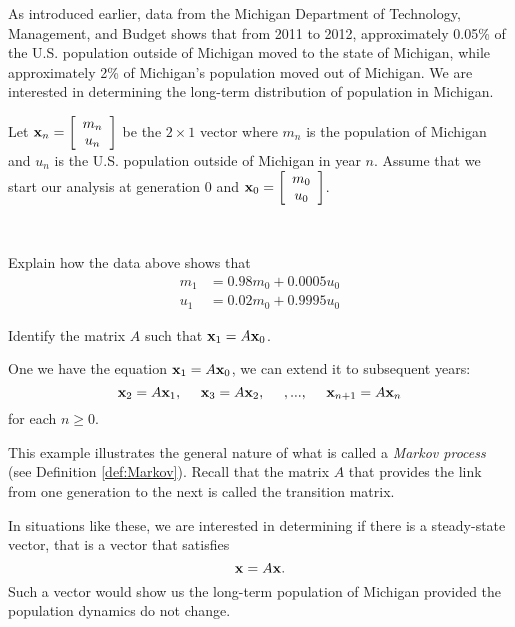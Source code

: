 \ee

\label{sec:proj_migration}

As introduced earlier, data from the Michigan Department of Technology, Management, and Budget shows that from 2011 to 2012, approximately 0.05\% of the U.S. population outside of Michigan moved to the state of Michigan, while approximately 2\% of Michigan's population moved out of Michigan. We are interested in determining the long-term distribution of population in Michigan. 

Let $\mathbf{x}_n = \left[ \begin{array}{c} m_n \\ u_n  \end{array} \right]$ be the $2 \times 1$ vector where $m_n$ is the population of Michigan and $u_n$ is the U.S. population outside of Michigan in year $n$. Assume that we start our analysis at generation 0 and $\mathbf{x}_0 = \left[ \begin{array}{c} m_0 \\ u_0 \end{array} \right]$.

\begin{pactivity} \label{act:Mi_pop_1} ~
\ba
\item Explain how the data above shows that 
\begin{align*}
m_1 &= 0.98m_0 + 0.0005u_0 \\
u_1 &= 0.02m_0 + 0.9995u_0
\end{align*}


\item Identify the matrix $A$ such that $\mathbf{x}_1 = A \mathbf{x}_{0}$. 


\ea

\end{pactivity}

One we have the equation $\mathbf{x}_1 = A\mathbf{x}_0$, we can extend it to subsequent years:
\[\vx_2 = A\vx_1, \ \ \ \ \vx_3 = A \vx_2, \ \ \ \ , ..., \ \ \ \ \vx_{n+1} = A \vx_n\]
for each $n \geq 0$.

This example illustrates the general nature of what is called a \emph{Markov process} (see Definition \ref{def:Markov}). Recall that the matrix $A$ that provides the link from one generation to the next is called the transition matrix.

In situations like these, we are interested in determining if there is a steady-state vector, that is a vector that satisfies 
\begin{equation} \label{eq:Mi_pop_2}
\mathbf{x} = A \mathbf{x}.
\end{equation}
Such a vector would show us the long-term population of Michigan provided the population dynamics do not change.

